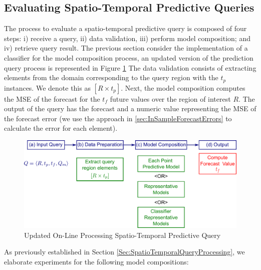 \subsection{Evaluating Spatio-Temporal Predictive Queries}
\label{Sec:ExperimentsQueries}

The process to evaluate a spatio-temporal predictive query is composed of four steps: i) receive a query, ii) data validation, iii) perform model composition; and iv) retrieve query result. The previous section consider the implementation of a classifier for the model composition process, an updated version of the prediction query process is represented in Figure \ref{Fig:OnLineQP_Update} The data validation consists of extracting elements from the domain corresponding to the query region with the $t_p$ instances. We denote this as $[R \times t_{p}]$. Next, the model composition computes the MSE of the forecast for the $t_{f}$ future values over the region of interest $R$. The output of the query has the forecast and a numeric value representing the MSE of the forecast error (we use the approach in \ref{sec:InSampleForecastErrors} to calculate the error for each element). 

\begin{figure}[h]
	\centering
	\includegraphics[scale=0.35]{../Figures/Query_Processing}
	\caption{Updated On-Line Processing Spatio-Temporal Predictive Query}
	\label{Fig:OnLineQP_Update}
\end{figure}

As previously established in Section \ref{Sec:SpatioTemporalQueryProcessing}, we elaborate experiments for the following model compositions:

